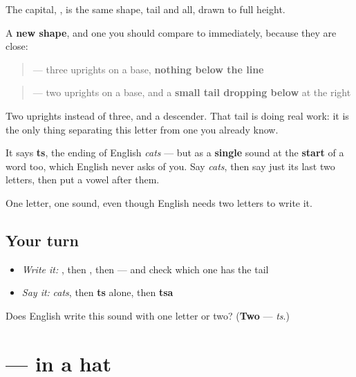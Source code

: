 \begin{quote}
   
\end{quote}

The capital, \textbf{}, is the same shape, tail and all, drawn to full height.

A \textbf{new shape}, and one you should compare to  immediately, because they are close:

\begin{quote}
 — three uprights on a base, \textbf{nothing below the line}
\end{quote}

\begin{quote}
 — two uprights on a base, and a \textbf{small tail dropping below} at the right
\end{quote}

Two uprights instead of three, and a descender. That tail is doing real work: it is the only thing separating this letter from one you already know.

It says \textbf{ts}, the ending of English \emph{cats} — but as a \textbf{single} sound at the \textbf{start} of a word too, which English never asks of you. Say \emph{cats}, then say just its last two letters, then put a vowel after them.

One letter, one sound, even though English needs two letters to write it.

\subsection*{Your turn}
\begin{itemize}
\raggedright
  \item \emph{Write it:} , then , then  — and check which one has the tail
  \item \emph{Say it:} \emph{cats}, then \textbf{ts} alone, then \textbf{tsa}
\end{itemize}

\begin{tcolorbox}[breakable,colback=teal!4,colframe=teal!35!black,title={Before you move on}]
Does English write this sound with one letter or two? (\textbf{Two} — \emph{ts}.)
\end{tcolorbox}
\section[\texorpdfstring{\ru{й} (y)}{й (y)}]{ —  in a hat}

